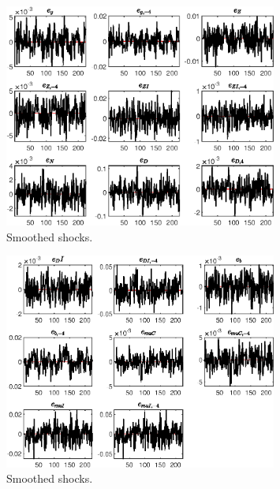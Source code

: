  
\begin{figure}[H]
\centering 
\includegraphics[width=0.80\textwidth]{BRS_sectoral_artificial_data/graphs/BRS_sectoral_artificial_data_SmoothedShocks1}
\caption{Smoothed shocks.}\label{Fig:SmoothedShocks:1}
\end{figure}

\begin{figure}[H]
\centering 
\includegraphics[width=0.80\textwidth]{BRS_sectoral_artificial_data/graphs/BRS_sectoral_artificial_data_SmoothedShocks2}
\caption{Smoothed shocks.}\label{Fig:SmoothedShocks:2}
\end{figure}


